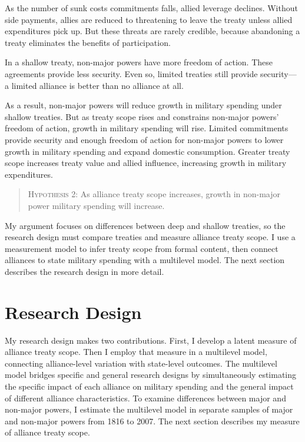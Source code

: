 \documentclass[12pt]{article}
\begin{document}
As the number of sunk costs commitments falls, allied leverage declines. 
Without side payments, allies are reduced to threatening to leave the treaty unless allied expenditures pick up. 
But these threats are rarely credible, because abandoning a treaty eliminates the benefits of participation. 


In a shallow treaty, non-major powers have more freedom of action.  
These agreements provide less security.  
Even so, limited treaties still provide security--- a limited alliance is better than no alliance at all. 


As a result, non-major powers will reduce growth in military spending under shallow treaties. 
But as treaty scope rises and constrains non-major powers' freedom of action, growth in military spending will rise. 
Limited commitments provide security and enough freedom of action for non-major powers to lower growth in military spending and expand domestic consumption. 
Greater treaty scope increases treaty value and allied influence, increasing growth in military expenditures. 


\begin{quote}
\textsc{Hypothesis 2}: As alliance treaty scope increases, growth in non-major power military spending will increase. 
\end{quote}


My argument focuses on differences between deep and shallow treaties, so the research design must compare treaties and measure alliance treaty scope.  
I use a measurement model to infer treaty scope from formal content, then connect alliances to state military spending with a multilevel model. 
The next section describes the research design in more detail. 



\section{Research Design} 


My research design makes two contributions. 
First, I develop a latent measure of alliance treaty scope. 
Then I employ that measure in a multilevel model, connecting alliance-level variation with state-level outcomes. 
The multilevel model bridges specific and general research designs by simultaneously estimating the specific impact of each alliance on military spending and the general impact of different alliance characteristics. 
To examine differences between major and non-major powers, I estimate the multilevel model in separate samples of major and non-major powers from 1816 to 2007. 
The next section describes my measure of alliance treaty scope. 
\end{document}
